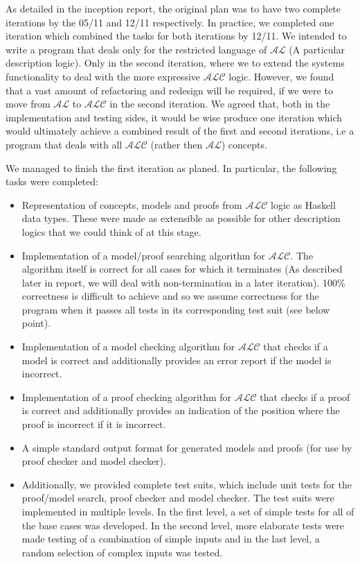 As detailed in the inception report, the original plan was to have two complete iterations by the 05/11 and 12/11 respectively. In practice, we completed one iteration which combined the tasks for both iterations by 12/11. We intended to write a program that deals only for the restricted language of $\mathcal{AL}$ (A particular description logic). Only in the second iteration, where we to extend the systems functionality to deal with the more expressive $\mathcal{ALC}$ logic. However, we found that a vast amount of refactoring and redesign will be required, if we were to move from $\mathcal{AL}$ to $\mathcal{ALC}$ in the second iteration.  We agreed that,  both in the implementation and testing sides, it would be wise produce one iteration which would ultimately achieve a combined result of the first and second iterations, i.e a program that deals with all $\mathcal{ALC}$ (rather then $\mathcal{AL}$) concepts.  

We managed to finish the first iteration as planed. In particular, the following tasks were completed:

\begin{itemize}
\item Representation of concepts, models and proofs from $\mathcal{ALC}$ logic as Haskell data types. These were made as extensible as possible for other description logics that we could think of at this stage. 
\item Implementation of a model/proof searching algorithm for $\mathcal{ALC}$. The algorithm itself is correct for all cases for which it terminates (As described later in report, we will deal with non-termination in a later iteration). 100\% correctness is difficult to achieve and so we assume correctness for the program when it passes all tests in its corresponding test suit (see below point). 
\item Implementation of a model checking algorithm for $\mathcal{ALC}$ that checks if a model is correct and additionally provides an error report if the model is incorrect.
\item Implementation of a proof checking algorithm for $\mathcal{ALC}$ that checks if a proof is correct and additionally provides an indication of the position where the proof is incorrect if it is incorrect. 
\item A simple standard output format for generated models and proofs (for use by proof checker and model checker). 
\item Additionally, we provided complete test suits, which include unit tests for the proof/model search, proof checker and model checker. The test suits were implemented in multiple levels. In the first level, a set of simple tests for all of  the base cases was developed. In the second level,  more elaborate tests were made testing of a combination of simple inputs and in the last level, a random selection of complex inputs was tested.  
\end{itemize} 

